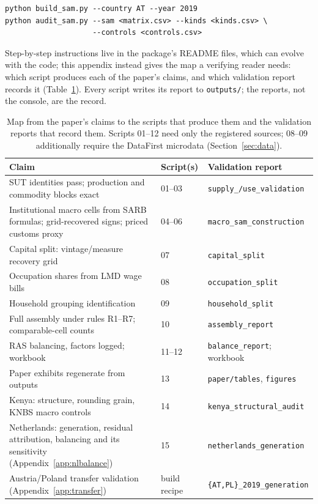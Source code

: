 {\small
\begin{verbatim}
python build_sam.py --country AT --year 2019
python audit_sam.py --sam <matrix.csv> --kinds <kinds.csv> \
                    --controls <controls.csv>
\end{verbatim}}

\noindent Step-by-step instructions live in the package's README files,
which can evolve with the code; this appendix instead gives the map a
verifying reader needs: which script produces each of the paper's
claims, and which validation report records it
(Table~\ref{tab:claimmap}). Every script writes its report to
\texttt{outputs/}; the reports, not the console, are the record.

\begin{table}[h]
\centering\small
\begin{tabularx}{\textwidth}{Xll}
\toprule
Claim & Script(s) & Validation report \\
\midrule
SUT identities pass; production and commodity blocks exact
  & 01--03 & \texttt{supply\_/use\_validation} \\
Institutional macro cells from SARB formulas; grid-recovered signs;
  priced customs proxy & 04--06 & \texttt{macro\_sam\_construction} \\
Capital split: vintage/measure recovery grid & 07 &
  \texttt{capital\_split} \\
Occupation shares from LMD wage bills & 08 & \texttt{occupation\_split} \\
Household grouping identification & 09 & \texttt{household\_split} \\
Full assembly under rules R1--R7; comparable-cell counts & 10 &
  \texttt{assembly\_report} \\
RAS balancing, factors logged; workbook & 11--12 &
  \texttt{balance\_report}; workbook \\
Paper exhibits regenerate from outputs & 13 & \texttt{paper/tables},
  \texttt{figures} \\
Kenya: structure, rounding grain, KNBS macro controls & 14 &
  \texttt{kenya\_structural\_audit} \\
Netherlands: generation, residual attribution, balancing and its
  sensitivity (Appendix~\ref{app:nlbalance}) & 15 &
  \texttt{netherlands\_generation} \\
Austria/Poland transfer validation (Appendix~\ref{app:transfer}) &
  build recipe & \texttt{\{AT,PL\}\_2019\_generation} \\
\bottomrule
\end{tabularx}
\caption{Map from the paper's claims to the scripts that produce them
and the validation reports that record them. Scripts 01--12 need only
the registered sources; 08--09 additionally require the DataFirst
microdata (Section~\ref{sec:data}).}
\label{tab:claimmap}
\end{table}
